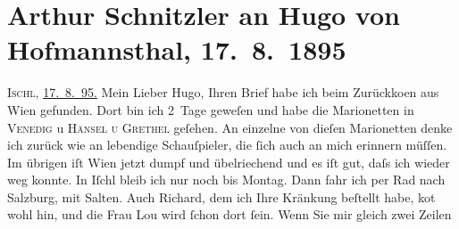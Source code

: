 

         
         \newcommand{\erwaehntePersonen}{Personen: Lou Andreas-Salomé, Richard Beer-Hofmann, Paul Goldmann, Hugo von Hofmannsthal, Fedor Mamroth, Felix Salten}
         \newcommand{\erwaehnteInstitutionen}{}
         \newcommand{\erwaehnteOrte}{Orte: Bad Ischl, Hodonín, München, Salzburg, Venedig in Wien, Wien}
         \newcommand{\erwaehnteWerke}{Werke: Die Frau des Weisen. Erzählung, Ein Abschied, Freiwild. Schauspiel in 3 Akten, Hänsel und Grethel}
               \section[Arthur Schnitzler an Hugo von Hofmannsthal, 17. 8. 1895]{ Arthur Schnitzler an Hugo von Hofmannsthal, 17. 8. 1895}\nopagebreak{}\rehead{ }\begin{ledgroupsized}[t]{13cm}\normalsize\beginnumbering \toendnotes[C]{\smallbreak\pagebreak[2]} 
\toendnotes[C]{\smallbreak}\pstart
           \raggedleft{}{\pb}\textsc{Ischl}, \uline{17. 8. 95.}\pend
           \pstart
           Mein Lieber Hugo, Ihren Brief habe ich beim Zurückko{\geminationm}en aus Wien
                    gefunden. Dort bin ich 2 Tage geweſen und habe die Marionetten in \textsc{Venedig} u \textsc{Hänsel u Grethel} geſehen. An einzelne von dieſen Marionetten denke ich zurück wie an
                    lebendige Schauſpieler, die ſich auch an mich erinnern müſſen. Im übrigen iſt
                        Wien jetzt dumpf und übelriechend und es
                    iſt gut, daſs ich wieder weg konnte. In Iſchl bleib ich nur noch bis Montag. Dann fahr ich per Rad nach
                        Salzburg, mit Salten. {\pb}Auch Richard, dem ich Ihre Kränkung beſtellt habe, ko{\geminationm}t wohl hin, und die Frau Lou wird ſchon dort ſein. Wenn Sie mir gleich zwei Zeilen

\end{ledgroupsized}
